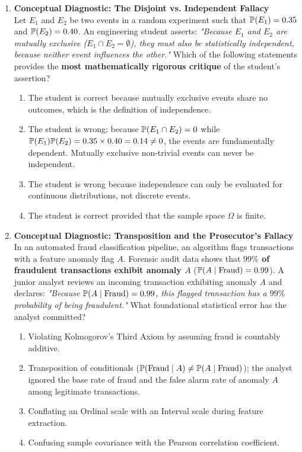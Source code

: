 \begin{enumerate}[resume]
\item \textbf{Conceptual Diagnostic: The Disjoint vs. Independent Fallacy} \\
Let $E_1$ and $E_2$ be two events in a random experiment such that $\P(E_1) = 0.35$ and $\P(E_2) = 0.40$. An engineering student asserts: \textit{"Because $E_1$ and $E_2$ are mutually exclusive ($E_1 \cap E_2 = \emptyset$), they must also be statistically independent, because neither event influences the other."} Which of the following statements provides the \textbf{most mathematically rigorous critique} of the student's assertion?
\begin{enumerate}
    \item The student is correct because mutually exclusive events share no outcomes, which is the definition of independence.
    \item The student is wrong; because $\P(E_1 \cap E_2) = 0$ while $\P(E_1)\P(E_2) = 0.35 \times 0.40 = 0.14 \neq 0$, the events are fundamentally dependent. Mutually exclusive non-trivial events can never be independent.
    \item The student is wrong because independence can only be evaluated for continuous distributions, not discrete events.
    \item The student is correct provided that the sample space $\Omega$ is finite.
\end{enumerate}

\item \textbf{Conceptual Diagnostic: Transposition and the Prosecutor's Fallacy} \\
In an automated fraud classification pipeline, an algorithm flags transactions with a feature anomaly flag $A$. Forensic audit data shows that \textbf{$99\%$ of fraudulent transactions exhibit anomaly $A$} ($\P(A \mid \text{Fraud}) = 0.99$). A junior analyst reviews an incoming transaction exhibiting anomaly $A$ and declares: \textit{"Because $\P(A \mid \text{Fraud}) = 0.99$, this flagged transaction has a $99\%$ probability of being fraudulent."} What foundational statistical error has the analyst committed?
\begin{enumerate}
    \item Violating Kolmogorov's Third Axiom by assuming fraud is countably additive.
    \item Transposition of conditionals ($\P(\text{Fraud} \mid A) \neq \P(A \mid \text{Fraud})$); the analyst ignored the base rate of fraud and the false alarm rate of anomaly $A$ among legitimate transactions.
    \item Conflating an Ordinal scale with an Interval scale during feature extraction.
    \item Confusing sample covariance with the Pearson correlation coefficient.
\end{enumerate}
\end{enumerate}
